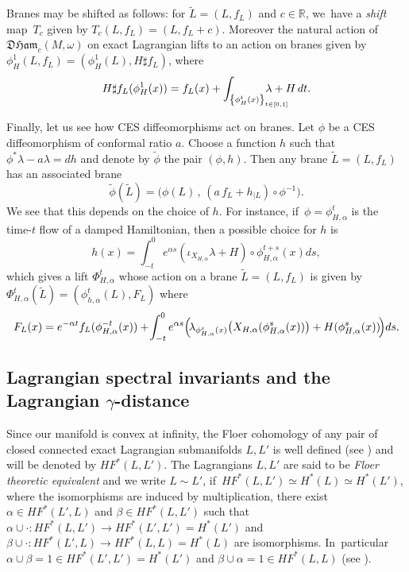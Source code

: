 \documentclass[JEP,XML,SOM,Unicode,NoFloatCountersInSection,published]{cedram}
\theoremstyle{definition}
\newcommand{\R}{\mathbb{R}}
\newcommand{\DHam}{\mathfrak{DHam}}
\begin{document}
Branes may be shifted as follows: for $\tilde L=(L,f_L)$ and $c\in\R$, we~have a \emph{shift} map~$T_c$ given by $T_c(L, f_L)= (L, f_L+c)$. Moreover the natural action of $\DHam_c(M,\omega)$ on exact Lagrangian lifts to an action on branes given by $\phi_H^1(L, f_L)=(\phi_H^1(L), H\sharp f_L)$, where
\begin{equation}
H\sharp f_L(\phi_H^1(x))=f_L(x)+\int_{\left\{\phi_H^t(x)\right\}_{t\in[0,1]}}\hspace*{-.8cm}\lambda+H\,dt.\label{eq:Ham-action-on-primitive}
\end{equation}

Finally, let us see how CES diffeomorphisms act on branes.
Let $\phi$ be a CES diffeomorphism of conformal ratio $a$. Choose a function $h$ such that $\phi^*\lambda-a\lambda=dh$ and denote by $\tilde \phi$ the pair $(\phi, h)$. Then any brane $\tilde L=(L,f_L)$ has an associated brane
\begin{equation}\label{eq:CES-on-brane}
\tilde \phi(\tilde L)=\bigl(\phi(L)\,,\, (a\,f_L+h_{\mid L})\circ\phi^{-1}\bigr).
\end{equation}
We see that this depends on the choice of $h$. For instance, if~$\phi=\phi_{H,\alpha}^t$ is the time-$t$ flow of a damped Hamiltonian, then a possible choice for $h$ is
\begin{equation}
\label{eq:conf-Ham-h}
h(x)=\int_{-t}^0e^{\alpha s}(\iota_{ X_{H,\alpha}}\lambda + H)\circ \phi_{H,\alpha}^{t+s}(x)ds,
\end{equation}
which gives a lift $\Phi_{H,\alpha}^t$ whose action on a brane $\tilde L=(L,f_L)$ is given by $\Phi_{H,\alpha}^t(\tilde L)=(\phi_{h,\alpha}^t(L),F_L)$ where
\begin{equation}\label{eq:conf-Ham-on-brane}
F_L(x)=e^{-\alpha t}f_L(\phi^{-t}_{H, \alpha}(x))+\!\int_{-t}^0e^{\alpha s}\Bigl(\!\lambda_{\phi^s_{H, \alpha}(x)}\bigl(X_{H, \alpha}(\phi_{H, \alpha}^s(x))\bigr)+H(\phi^s_{H, \alpha}(x))\!\Bigr)ds.
\end{equation}

\subsection{Lagrangian spectral invariants and the Lagrangian \texorpdfstring{$\gamma$}{gamma}-distance}\label{sec:Lagrangian-spectral-inv}

Since our manifold is convex at infinity, the Floer cohomology of any pair of closed connected
exact Lagrangian submanifolds $L,L'$ is well defined (see \cite{Floer-Lag-intersection, McDuff-contact-boundaries, Viterbo-FunctorsI}) and will be denoted by $HF^*(L,L')$. The Lagrangians $L, L'$ are said to be \emph{Floer theoretic equivalent} and we write $L\sim L'$, if~$HF^*(L,L')\simeq
H^*(L)\simeq H^*(L')$, where the isomorphisms are induced by multiplication, \ie there exist $\alpha \in HF^*(L',L)$ and $\beta \in HF^*(L,L')$ such that $\alpha \cup\cdot : HF^*(L,L') \to HF^*(L',L')=H^*(L')$ and $\beta \cup \cdot : HF^*(L',L) \to HF^*(L,L)=H^*(L)$ are isomorphisms. In~particular $\alpha\cup \beta =1\in HF^*(L',L')=H^*(L')$ and $\beta \cup \alpha=1 \in HF^*(L,L)$ (see \cite[Def.\,3.5]{Abouzaid-Kragh}).
\end{document}
